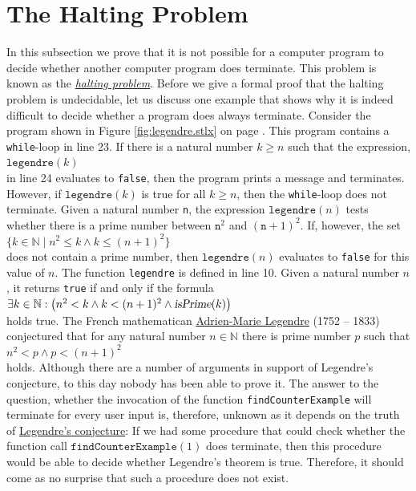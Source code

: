 \section{The Halting Problem}
In this subsection we prove that it is not possible for a computer program to decide whether 
another computer program does terminate.
This problem is known as the 
\href{http://en.wikipedia.org/wiki/Halting_problem}{\emph{halting problem}}.
Before we give a formal proof that the halting problem is undecidable, let us
discuss one example that shows why it is indeed difficult to decide whether a program does always
terminate.
Consider the program shown in Figure \ref{fig:legendre.stlx} on page
\pageref{fig:legendre.stlx}.  This program contains a \texttt{while}-loop in line 23.  
If there is a natural number $k \geq n$ such that the expression,
\\[0.2cm]
\hspace*{1.3cm}
$\mathtt{legendre}(k)$
\\[0.2cm]
in line 24 evaluates to \texttt{false}, then the program prints a message and terminates.
However, if 
$\mathtt{legendre}(k)$ is true for all $k \geq n$, then the \texttt{while}-loop does not terminate.
Given a natural number \texttt{n}, the expression
$\texttt{legendre}(n)$ tests whether there is a prime number between $\texttt{n}^2$ and $(\texttt{n}+1)^2$.
If, however, the set
\\[0.2cm]
\hspace*{1.3cm}
$\{ k \in \mathbb{N} \mid n^2 \leq k \wedge k \leq (n+1)^2 \}$
\\[0.2cm]
does not contain a prime number, then $\texttt{legendre}(n)$ evaluates
to \texttt{false} for this value of $n$.
The function \texttt{legendre} is defined in line 10.  
Given a natural number $n$, it returns \texttt{true} if and only if the formula
\\[0.2cm]
\hspace*{1.3cm}
$\exists k \in \mathbb{N}:\bigl( n^2 < k \wedge k < (n+1)^2 \wedge \textsl{isPrime}(k)\bigr)$
\\[0.2cm]
holds true.
The French mathematican 
\href{http://en.wikipedia.org/wiki/Adrien-Marie_Legendre}{Adrien-Marie Legendre} (1752 -- 1833) conjectured that
for any natural number $n \in \mathbb{N}$ there is prime number $p$ such that
\\[0.2cm]
\hspace*{1.3cm}
$n^2 < p \wedge  p < (n+1)^2$
\\[0.2cm]
holds.
Although there are a number of arguments in support of Legendre's conjecture,  to this day
nobody has been able to prove it.
The answer to the question, whether the invocation of the function \texttt{findCounterExample} will
terminate for every user input is, therefore, unknown as it depends on the truth of 
\href{http://en.wikipedia.org/wiki/Legendre's_conjecture}{Legendre's conjecture}:  If we
had some procedure that could check whether the function call $\texttt{findCounterExample}(1)$ does terminate,
then this procedure would be able to decide whether Legendre's theorem is true.
Therefore, it should come as no surprise that such a procedure does not exist.

